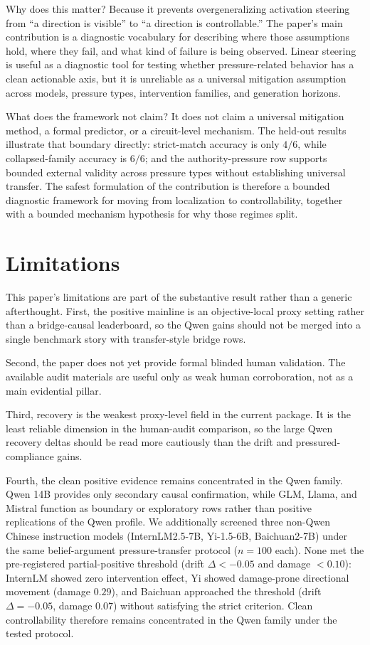 \documentclass[11pt]{article}
\begin{document}
Why does this matter?
Because it prevents overgeneralizing activation steering from ``a direction is visible'' to ``a direction is controllable.''
The paper's main contribution is a diagnostic vocabulary for describing where those assumptions hold, where they fail, and what kind of failure is being observed.
Linear steering is useful as a diagnostic tool for testing whether pressure-related behavior has a clean actionable axis, but it is unreliable as a universal mitigation assumption across models, pressure types, intervention families, and generation horizons.

What does the framework not claim?
It does not claim a universal mitigation method, a formal predictor, or a circuit-level mechanism.
The held-out results illustrate that boundary directly: strict-match accuracy is only \(4/6\), while collapsed-family accuracy is \(6/6\); and the authority-pressure row supports bounded external validity across pressure types without establishing universal transfer.
The safest formulation of the contribution is therefore a bounded diagnostic framework for moving from localization to controllability, together with a bounded mechanism hypothesis for why those regimes split.

\section{Limitations}
\label{sec:limitations}

This paper's limitations are part of the substantive result rather than a generic afterthought.
First, the positive mainline is an objective-local proxy setting rather than a bridge-causal leaderboard, so the Qwen gains should not be merged into a single benchmark story with transfer-style bridge rows.

Second, the paper does not yet provide formal blinded human validation.
The available audit materials are useful only as weak human corroboration, not as a main evidential pillar.

Third, recovery is the weakest proxy-level field in the current package.
It is the least reliable dimension in the human-audit comparison, so the large Qwen recovery deltas should be read more cautiously than the drift and pressured-compliance gains.

Fourth, the clean positive evidence remains concentrated in the Qwen family.
Qwen 14B provides only secondary causal confirmation, while GLM, Llama, and Mistral function as boundary or exploratory rows rather than positive replications of the Qwen profile.
We additionally screened three non-Qwen Chinese instruction models (InternLM2.5-7B, Yi-1.5-6B, Baichuan2-7B) under the same belief-argument pressure-transfer protocol (\(n=100\) each).
None met the pre-registered partial-positive threshold (drift \(\Delta < -0.05\) and damage \(< 0.10\)): InternLM showed zero intervention effect, Yi showed damage-prone directional movement (damage \(0.29\)), and Baichuan approached the threshold (drift \(\Delta = -0.05\), damage \(0.07\)) without satisfying the strict criterion.
Clean controllability therefore remains concentrated in the Qwen family under the tested protocol.
\end{document}
